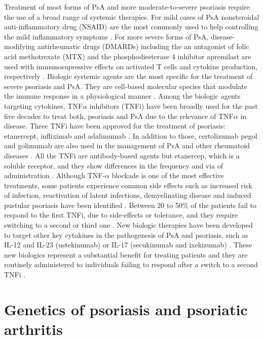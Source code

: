 Treatment of most forms of PsA and more moderate-to-severe psoriasis require the use of a broad range of systemic therapies. For mild cases of PsA nonsteroidal anti-inflammatory drug (NSAID) are the most commonly used to help controlling the mild inflammatory symptoms \parencite{Coates2016}. For more severe forms of PsA, disease-modifying antirheumatic drugs (DMARDs) including the an antagonist of folic acid methotrexate (MTX) and the phosphodiesterase 4 inhibitor apremilast are used with immunosupressive effects on activated T cells and cytokine production, respectively \parencite{Schmitt2014, Gossec2016, Keating2017,Polachek2017}. Biologic systemic agents are the most specific for the treatment of severe psoriasis and PsA. They are cell-based molecular species that modulate the immune response in a physiological manner \parencite{Perera2012}. Among the biologic agents targeting cytokines, TNF$\alpha$ inhibitors (TNFi) have been broadly used for the past five decades to treat both, psoriasis and PsA due to the relevance of TNF$\alpha$ in disease. Three TNFi have been approved for the treatment of psoriasis: etanercept, infliximab and adalimumab \parencite{Ahil2016}. In addition to those, certolizumab pegol and golimumab are also used in the management of PsA and other rheumatoid diseases \parencite{Coates2016b}. All the TNFi are antibody-based agents but etanercep, which is a soluble receptor, and they show differences in the frequency and via of administration \parencite{Mease2000}. Although TNF-$\alpha$ blockade is one of the most effective treatments, some patients experience common side effects such as increased risk of infection, reactivation of latent infections, demyelinating disease and induced pustular psoriasis have been identified \parencite{Nickoloff2004}. Between 20 to 50\% of the patients fail to respond to the first TNFi, due to side-effects or tolerance, and they require switching to a second or third one \parencite{Abramson2016}. New biologic therapies have been developed to target other key cytokines in the pathogenesis of PsA and psoriasis, such as IL-12 and IL-23 (ustekinumab) or  IL-17 (secukinumab and ixekizumab) \parencite{Mahil2016}. These new biologics represent a substantial benefit for treating patients and they are routinely administered to individuals failing to respond after a switch to a second TNFi \parencite{Coates2016b}.
 

\section{Genetics of psoriasis and psoriatic arthritis}

